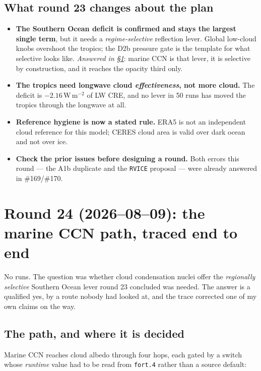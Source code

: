 \documentclass[10pt]{article}
\begin{document}
\subsection{What round 23 changes about the plan}\label{sub:r23plan}
\begin{itemize}\itemsep2pt
\item \textbf{The Southern Ocean deficit is confirmed and stays the largest single term}, but
it needs a \emph{regime-selective} reflection lever. Global low-cloud knobs overshoot the
tropics; the D2b pressure gate is the template for what selective looks like.
\emph{Answered in \S\ref{sec:r24}}: marine CCN is that lever, it is selective by
construction, and it reaches the opacity third only.
\item \textbf{The tropics need longwave cloud \emph{effectiveness}, not more cloud.} The
deficit is $-2.16$\,W\,m$^{-2}$ of LW CRE, and no lever in 50 runs has moved the tropics
through the longwave at all.
\item \textbf{Reference hygiene is now a stated rule.} ERA5 is not an independent cloud
reference for this model; CERES cloud area is valid over dark ocean and not over ice.
\item \textbf{Check the prior issues before designing a round.} Both errors this round --- the
A1b duplicate and the \texttt{RVICE} proposal --- were already answered in \#169/\#170.
\end{itemize}

\section{Round 24 (2026--08--09): the marine CCN path, traced end to end}\label{sec:r24}
No runs. The question was whether cloud condensation nuclei offer the \emph{regionally
selective} Southern Ocean lever round 23 concluded was needed. The answer is a qualified
yes, by a route nobody had looked at, and the trace corrected one of my own claims on the
way.

\subsection{The path, and where it is decided}\label{sub:r24path}
Marine CCN reaches cloud albedo through four hops, each gated by a switch whose
\emph{runtime} value had to be read from \texttt{fort.4} rather than a source default:
\end{document}
